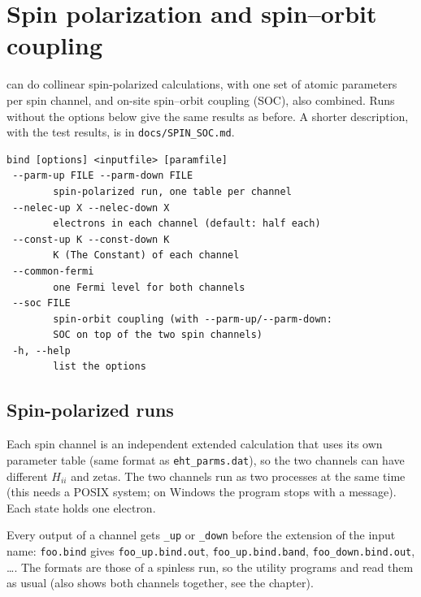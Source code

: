 \chapter{Spin polarization and spin--orbit coupling}
\sloppy

\calcprog can do collinear spin-polarized calculations, with one set of
atomic parameters per spin channel, and on-site spin--orbit coupling
(SOC), also combined. Runs without the options below give the same
results as before. A shorter description, with the test results, is in
{\tt docs/SPIN\_SOC.md}.

\shrinkspacing
\begin{verbatim}
bind [options] <inputfile> [paramfile]
 --parm-up FILE --parm-down FILE
        spin-polarized run, one table per channel
 --nelec-up X --nelec-down X
        electrons in each channel (default: half each)
 --const-up K --const-down K
        K (The Constant) of each channel
 --common-fermi
        one Fermi level for both channels
 --soc FILE
        spin-orbit coupling (with --parm-up/--parm-down:
        SOC on top of the two spin channels)
 -h, --help
        list the options
\end{verbatim}
\resumespacing

\section{Spin-polarized runs}


Each spin channel is an independent extended \huek calculation that
uses its own parameter table (same format as {\tt eht\_parms.dat}), so
the two channels can have different $H_{ii}$ and zetas. The two
channels run as two processes at the same time (this needs a POSIX
system; on Windows the program stops with a message). Each state holds
one electron.

Every output of a channel gets {\tt \_up} or {\tt \_down} before the
extension of the input name: {\tt foo.bind} gives {\tt foo\_up.bind.out},
{\tt foo\_up.bind.band}, {\tt foo\_down.bind.out}, \ldots. The formats
are those of a spinless run, so the utility programs and \viewprog read
them as usual (\viewprog also shows both channels together, see the
\viewprog chapter).

